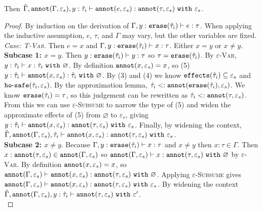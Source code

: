 \begin{appendix}
\begin{lemma}
\noindent
Then $\hat \Gamma, \mathtt{annot}(\Gamma, \varepsilon_s), y: \hat \tau_i \vdash \mathtt{annot}(e, \varepsilon_s) : \mathtt{annot}(\tau, \varepsilon_s)~\mathtt{with}~ \varepsilon_s$.
\end{lemma}

\begin{proof}
By induction on the derivation of $\Gamma, y: \mathtt{erase}(\hat \tau_i) \vdash e: \tau$. When applying the inductive assumption, $e$, $\tau$, and $\Gamma$ may vary, but the other variables are fixed. \\

\textit{Case: \textsc{T-Var}}. Then $e=x$ and $\Gamma, y: \mathtt{erase}(\hat \tau_i) \vdash x: \tau$. Either $x=y$ or $x \neq y$. \\

\textbf{Subcase 1: $x = y$}. Then $y: \mathtt{erase}(\hat \tau_i) \vdash y: \tau$ so $\tau = \mathtt{erase}(\hat \tau_i)$. By \textsc{$\varepsilon$-Var}, $y: \hat \tau_i \vdash x: \hat \tau_i~\mathtt{with}~ \varnothing$. By definition $\mathtt{annot}(x, \varepsilon_s) = x$, so (5) $y: \hat \tau_i \vdash \mathtt{annot}(x, \varepsilon_s): \hat \tau_i~\mathtt{with}~ \varnothing$. By (3) and (4) we know $\mathtt{effects}(\hat \tau_i) \subseteq \varepsilon_s$ and $\mathtt{ho \hbox{-} safe}(\hat \tau_i, \varepsilon_s)$. By the approximation lemma, $\hat \tau_i <: \mathtt{annot}(\mathtt{erase}(\hat \tau_i), \varepsilon_s)$. We know $\mathtt{erase}(\hat \tau_i) = \tau$, so this judgement can be rewritten as $\hat \tau_i <: \mathtt{annot}(\tau, \varepsilon_s)$. From this we can use \textsc{$\varepsilon$-Subsume} to narrow the type of (5) and widen the approximate effects of (5) from $\varnothing$ to $\varepsilon_s$, giving $y: \hat \tau_i \vdash \mathtt{annot}(x, \varepsilon_s): \mathtt{annot}(\tau, \varepsilon_s)~\mathtt{with}~ \varepsilon_s$. Finally, by widening the context, $\hat \Gamma, \mathtt{annot}(\Gamma, \varepsilon_s), \hat \tau_i \vdash \mathtt{annot}(x, \varepsilon_s): \mathtt{annot}(\tau, \varepsilon_s)~\mathtt{with}~ \varepsilon_s$.\\

\textbf{Subcase 2: $x \neq y$}. Because $\Gamma, y: \mathtt{erase}(\hat \tau_i) \vdash x: \tau$ and $x \neq y$ then $x: \tau \in \Gamma$. Then $x: \mathtt{annot}(\tau, \varepsilon_s) \in \mathtt{annot}(\Gamma, \varepsilon_s)$ so $\mathtt{annot}(\Gamma, \varepsilon_s) \vdash x: \mathtt{annot}(\tau, \varepsilon_s)~\mathtt{with}~ \varnothing$ by \textsc{$\varepsilon$-Var}. By definition $\mathtt{annot}(x, \varepsilon_s) = x$, so $\mathtt{annot}(\Gamma, \varepsilon_s) \vdash \mathtt{annot}(x, \varepsilon_s): \mathtt{annot}(\tau, \varepsilon_s)~\mathtt{with}~ \varnothing$. Applying \textsc{$\varepsilon$-Subsume} gives $\mathtt{annot}(\Gamma, \varepsilon_s) \vdash \mathtt{annot}(x, \varepsilon_s): \mathtt{annot}(\tau, \varepsilon_s)~\mathtt{with}~ \varepsilon_s$. By widening the context $\hat \Gamma, \mathtt{annot}(\Gamma, \varepsilon_s), y: \hat \tau_i \vdash \mathtt{annot}(\tau, \varepsilon_s)~\mathtt{with}~ \varepsilon'$.\\


\end{proof}
\end{appendix}
